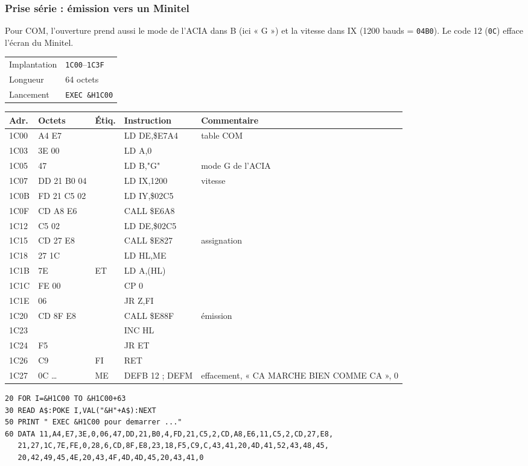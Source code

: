 \documentclass[a4paper,10pt]{article}
\makeatletter
\newcommand{\hex}[1]{\texttt{#1}}
\newcommand{\fiche}[3]{%
  \begin{center}\small
  \begin{tabular}{@{}ll@{}}
  \toprule
  Implantation & #1 \\
  Longueur & #2 \\
  Lancement & #3 \\
  \bottomrule
  \end{tabular}
  \end{center}}
\newenvironment{asm}
  {\small\begin{longtable}{@{}>{\ttfamily}l>{\ttfamily}l>{\ttfamily}l>{\ttfamily}l>{\raggedright\arraybackslash}p{6.2cm}@{}}
   \toprule
   \normalfont\bfseries Adr. & \normalfont\bfseries Octets & \normalfont\bfseries Étiq. & \normalfont\bfseries Instruction & \textbf{Commentaire}\\
   \midrule\endhead
   \bottomrule\endfoot}
  {\end{longtable}}
\makeatother
\begin{document}
\subsubsection*{Prise série : émission vers un Minitel}
Pour COM, l'ouverture prend aussi le mode de l'ACIA dans B (ici « G ») et la
vitesse dans IX (1200 bauds = \hex{04B0}). Le code 12 (\hex{0C}) efface
l'écran du Minitel.
\fiche{\hex{1C00}--\hex{1C3F}}{64 octets}{\texttt{EXEC \&H1C00}}
\begin{asm}
1C00 & 11 A4 E7 & & LD DE,\$E7A4   & table COM \\
1C03 & 3E 00    & & LD A,0         & \\
1C05 & 06 47    & & LD B,"G"       & mode G de l'ACIA \\
1C07 & DD 21 B0 04 & & LD IX,1200  & vitesse \\
1C0B & FD 21 C5 02 & & LD IY,\$02C5 & \\
1C0F & CD A8 E6 & & CALL \$E6A8    & \\
1C12 & 11 C5 02 & & LD DE,\$02C5   & \\
1C15 & CD 27 E8 & & CALL \$E827    & assignation \\
1C18 & 21 27 1C & & LD HL,ME       & \\
1C1B & 7E       & ET & LD A,(HL)   & \\
1C1C & FE 00    & & CP 0           & \\
1C1E & 28 06    & & JR Z,FI        & \\
1C20 & CD 8F E8 & & CALL \$E88F    & émission \\
1C23 & 23       & & INC HL         & \\
1C24 & 18 F5    & & JR ET          & \\
1C26 & C9       & FI & RET         & \\
1C27 & 0C \dots & ME & DEFB 12 ; DEFM & effacement, « CA MARCHE BIEN COMME CA », 0 \\
\end{asm}
\begin{verbatim}
20 FOR I=&H1C00 TO &H1C00+63
30 READ A$:POKE I,VAL("&H"+A$):NEXT
50 PRINT " EXEC &H1C00 pour demarrer ..."
60 DATA 11,A4,E7,3E,0,06,47,DD,21,B0,4,FD,21,C5,2,CD,A8,E6,11,C5,2,CD,27,E8,
   21,27,1C,7E,FE,0,28,6,CD,8F,E8,23,18,F5,C9,C,43,41,20,4D,41,52,43,48,45,
   20,42,49,45,4E,20,43,4F,4D,4D,45,20,43,41,0
\end{verbatim}
\end{document}
